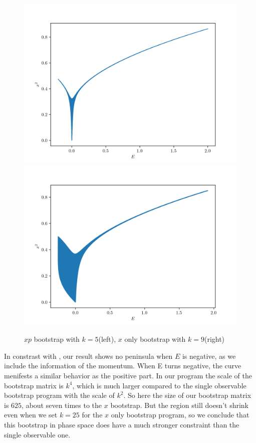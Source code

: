 \documentclass[aps, preprint,amsmath, amssymb]{revtex4-2}
\begin{document}
\begin{figure}
    \includegraphics[width=0.45\linewidth]{plot_5.png}
    \includegraphics[width=0.45\linewidth]{x_9.png}
    \caption{$xp$ bootstrap with $k = 5$(left), $x$ only bootstrap with $k = 9$(right)}
    \label{fig:doublewell}
\end{figure}

%

In constrast with \cite{Nakayama_2022}, our result shows no peninsula when $E$ is negative, as we include the information of the momentum. When E turns negative, the curve menifests a similar behavior as the positive part. In our program the scale of the bootstrap matrix is $k^4$, which is much larger compared to the single observable bootstrap program with the scale of $k^2$. So here the size of our bootstrap matrix is $625$, about seven times to the $x$ bootstrap. But the region still doesn't shrink even when we set $k = 25$ for the $x$ only bootstrap program, so we conclude that this bootstrap in phase space does have a much stronger constraint than the single observable one.

\end{document}

